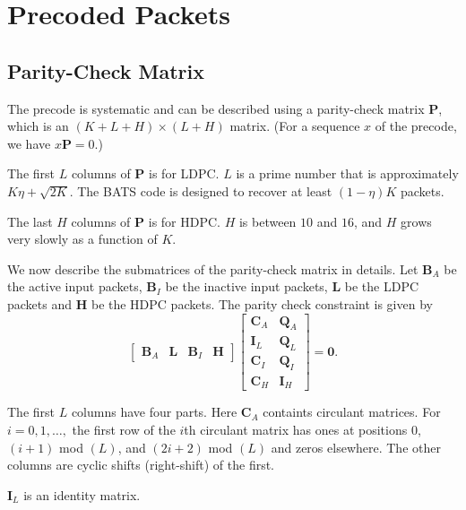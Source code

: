 \documentclass{report}
\newcommand{\bats}{BATS}
\newcommand{\precheck}{\mathbf{P}}
\newcommand{\ldpcnum}{L}
\newcommand{\hdpcnum}{H}
\begin{document}
\section{Precoded Packets}

\subsection{Parity-Check Matrix}

The precode is systematic and can be described using a parity-check
matrix $\precheck$, which is an $(K+\ldpcnum{}+\hdpcnum)\times (\ldpcnum{}+\hdpcnum)$ matrix. (For
a sequence $x$ of the precode, we have $x\precheck = 0$.) 

The first $\ldpcnum{}$ columns of $\precheck$ is for LDPC. $\ldpcnum{}$ is a prime
number that is approximately $K \eta + \sqrt{2K}$. 
The \bats{} code is designed to recover at least $(1-\eta)K$ packets.

The last $\hdpcnum$ columns of $\precheck$ is for HDPC. $\hdpcnum$ is between
$10$ and $16$, and $\hdpcnum$ grows very slowly as a function of $K$.

We now describe the submatrices of the parity-check matrix in
details. Let $\mathbf{B}_A$ be the active input packets, $\mathbf{B}_I$ be the
inactive input packets, $\mathbf{L}$ be the LDPC packets and
$\mathbf{H}$ be the HDPC packets. The parity check constraint is given by
\begin{equation*}
  \begin{bmatrix}
    \mathbf{B}_A & \mathbf{L} & \mathbf{B}_I & \mathbf{H}
  \end{bmatrix}
  \begin{bmatrix}
    \mathbf{C}_A & \mathbf{Q}_A \\
    \mathbf{I}_L & \mathbf{Q}_L \\
    \mathbf{C}_{I} & \mathbf{Q}_I \\
    \mathbf{C}_{H} & \mathbf{I}_H
  \end{bmatrix}
  = \mathbf{0}.
\end{equation*}



The first $\ldpcnum{}$ columns have four parts. 
Here $\mathbf{C}_A$ containts circulant matrices. For $i=0,1,\ldots,$ the first row of the $i$th
circulant matrix has ones at positions $0$, $(i+1)$ mod $(\ldpcnum{})$, and
$(2i+2)$ mod $(\ldpcnum{})$ and zeros elsewhere. The other columns are cyclic
shifts (right-shift) of the first.

$\mathbf{I}_L$ is an identity matrix. 
\end{document}
